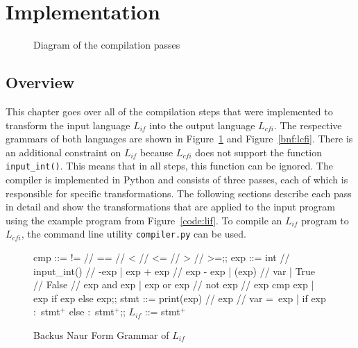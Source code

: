\newpage
\section{Implementation}

\begin{figure}[h!]
	\centering
	\caption{Diagram of the compilation passes}
\end{figure}

\subsection{Overview}
This chapter goes over all of the compilation steps that were implemented to transform the input language $L_{if}$ into the output language $L_{cfi}$. 
The respective grammars of both languages are shown in Figure~\ref{bnf:lif} and Figure~\ref{bnf:lcfi}.
There is an additional constraint on $L_{if}$ because $L_{cfi}$ does not support the function \texttt{input\_int()}. This means that in all steps, this function can be ignored.
The compiler is implemented in Python and consists of three passes, each of which is responsible for specific transformations.
The following sections describe each pass in detail and show the transformations that are applied to the input program using the example program from Figure~\ref{code:lif}. To compile an $L_{if}$ program to $L_{cfi}$, the command line utility \texttt{compiler.py} can be used.

\begin{figure}[h!]
	\centering
	\begin{bnf}[row{-} = {bg = gray9}]
		cmp ::= != // == // < // <= // > // >=;;
		exp ::= int // input\_int() // -exp
		| exp + exp // exp - exp
		| (exp) // var
		| True // False // exp and exp
		| exp or exp // not exp // exp cmp exp
		| exp if exp else exp;;
		stmt ::= print(exp) // exp // var = exp
		| if exp $\colon$ stmt$^+$ else $\colon$ stmt$^+$;;
		$L_{if}$ ::= stmt$^+$
	\end{bnf}
	\caption{Backus Naur Form Grammar of $L_{if}$}
	\label{bnf:lif}
\end{figure}

